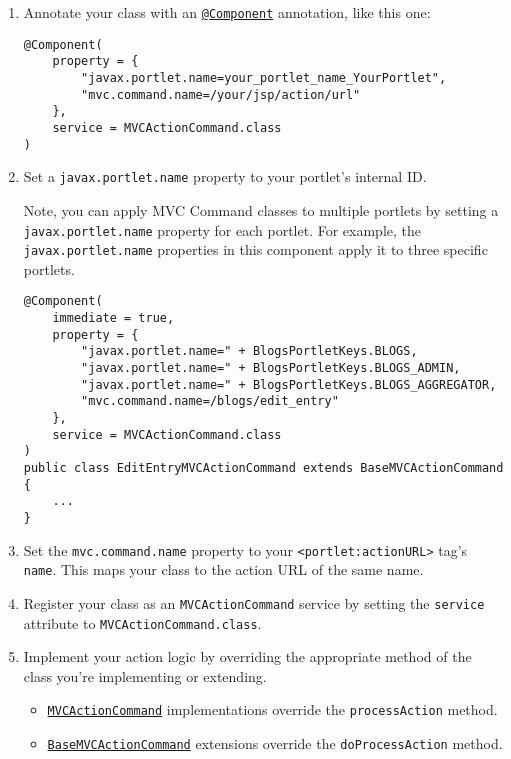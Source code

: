 \noindent\hrulefill

\begin{enumerate}
\def\labelenumi{\arabic{enumi}.}
\setcounter{enumi}{3}
\item
  Annotate your class with an
  \href{https://docs.osgi.org/javadoc/osgi.cmpn/7.0.0/org/osgi/service/component/annotations/Component.html}{\texttt{@Component}}
  annotation, like this one:

\begin{verbatim}
@Component(
    property = {
        "javax.portlet.name=your_portlet_name_YourPortlet",
        "mvc.command.name=/your/jsp/action/url"
    },
    service = MVCActionCommand.class
)
\end{verbatim}
\item
  Set a \texttt{javax.portlet.name} property to your portlet's internal
  ID.

  Note, you can apply MVC Command classes to multiple portlets by
  setting a \texttt{javax.portlet.name} property for each portlet. For
  example, the \texttt{javax.portlet.name} properties in this component
  apply it to three specific portlets.

\begin{verbatim}
@Component(
    immediate = true,
    property = {
        "javax.portlet.name=" + BlogsPortletKeys.BLOGS,
        "javax.portlet.name=" + BlogsPortletKeys.BLOGS_ADMIN,
        "javax.portlet.name=" + BlogsPortletKeys.BLOGS_AGGREGATOR,
        "mvc.command.name=/blogs/edit_entry"
    },
    service = MVCActionCommand.class
)
public class EditEntryMVCActionCommand extends BaseMVCActionCommand {
    ...
}
\end{verbatim}
\item
  Set the \texttt{mvc.command.name} property to your
  \texttt{\textless{}portlet:actionURL\textgreater{}} tag's
  \texttt{name}. This maps your class to the action URL of the same
  name.
\item
  Register your class as an \texttt{MVCActionCommand} service by setting
  the \texttt{service} attribute to \texttt{MVCActionCommand.class}.
\item
  Implement your action logic by overriding the appropriate method of
  the class you're implementing or extending.

  \begin{itemize}
  \item
    \href{https://docs.liferay.com/dxp/portal/7.2-latest/javadocs/portal-kernel/com/liferay/portal/kernel/portlet/bridges/mvc/MVCActionCommand.html}{\texttt{MVCActionCommand}}
    implementations override the \texttt{processAction} method.
  \item
    \href{https://docs.liferay.com/dxp/portal/7.2-latest/javadocs/portal-kernel/com/liferay/portal/kernel/portlet/bridges/mvc/BaseMVCActionCommand.html}{\texttt{BaseMVCActionCommand}}
    extensions override the \texttt{doProcessAction} method.
  \end{itemize}


\end{enumerate}
